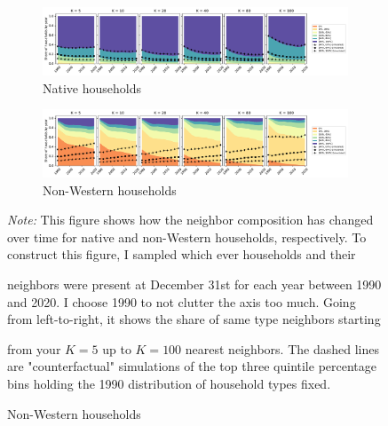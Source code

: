 \documentclass[main.tex]{subfiles}
\begin{document}
\begin{landscape}
\begin{figure}[p]
    \centering    
    \caption{Same type neighbor by $K$-nearest proximity (1990-2020)}
    \label{fig:temporal_development_knn}
    \begin{subfigure}{\paperwidth}
    \centering
    \includegraphics[width=\textwidth]{figs/temporal_knn_native_1990_2020_w_sim.pdf}    
    \caption{Native households}
    \label{fig:temporal_knn_native_1990_2020}
    \end{subfigure}	
    
    \begin{subfigure}{\paperwidth}
    \centering
    \includegraphics[width=\textwidth]{figs/temporal_knn_non_west_1990_2020_w_sim.pdf}
    \caption{Non-Western households}
    \label{fig:temporal_knn_non_west_1990_2020}
    \end{subfigure}	
    
    \begin{minipage}{0.85\linewidth}
    \begin{tablenotes}
    \item \scriptsize \textit{Note:} This figure shows how the neighbor composition has changed over time for native and non-Western households, respectively. To construct this figure, I sampled which ever households and their 
    
    neighbors were present at December 31st for each year between 1990 and 2020. I choose 1990 to not clutter the axis too much. Going from left-to-right, it shows the share of same type neighbors starting 
    
    from your $K=5$ up to $K=100$ nearest neighbors. The dashed lines are "counterfactual" simulations of the top three quintile percentage bins holding the 1990 distribution of household types fixed.
    \end{tablenotes}
    \end{minipage}
\end{figure}    
\end{landscape}
\end{document}
